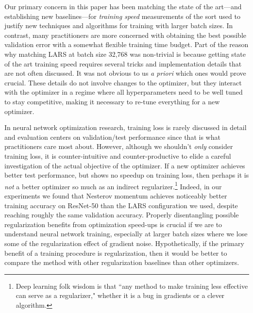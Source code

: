 \documentclass{article}
\begin{document}
Our primary concern in this paper has been matching the state of the art---and establishing new baselines---for \emph{training speed} measurements of the sort used to justify new techniques and algorithms for training with larger batch sizes. In contrast, many practitioners are more concerned with obtaining the best possible validation error with a somewhat flexible training time budget. Part of the reason why matching LARS at batch size 32,768 was non-trivial is because getting state of the art training speed requires several tricks and implementation details that are not often discussed. It was not obvious to us \emph{a priori} which ones would prove crucial. These details do not involve changes to the optimizer, but they interact with the optimizer in a regime where all hyperparameters need to be well tuned to stay competitive, making it necessary to re-tune everything for a new optimizer. 

In neural network optimization research, training loss is rarely discussed in detail and evaluation centers on validation/test performance since that is what practitioners care most about. However, although we shouldn't \emph{only} consider training loss, it is counter-intuitive and counter-productive to elide a careful investigation of the actual objective of the optimizer. If a new optimizer achieves better test performance, but shows no speedup on training loss, then perhaps it is \emph{not} a better optimizer so much as an indirect regularizer.\footnote{Deep learning folk wisdom is that ``any method to make training less effective can serve as a regularizer," whether it is a bug in gradients or a clever algorithm.} Indeed, in our experiments we found that Nesterov momentum achieves noticeably better training accuracy on ResNet-50 than the LARS configuration we used, despite reaching roughly the same validation accuracy. Properly disentangling possible regularization benefits from optimization speed-ups is crucial if we are to understand neural network training, especially at larger batch sizes where we lose some of the regularization effect of gradient noise. Hypothetically, if the primary benefit of a training procedure is regularization, then it would be better to compare the method with other regularization baselines than other optimizers.
\end{document}
